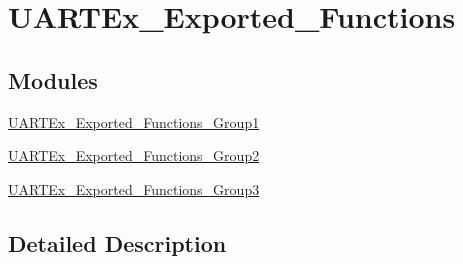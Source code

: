 \hypertarget{group___u_a_r_t_ex___exported___functions}{}\section{U\+A\+R\+T\+Ex\+\_\+\+Exported\+\_\+\+Functions}
\label{group___u_a_r_t_ex___exported___functions}
\subsection*{Modules}
\begin{DoxyCompactItemize}
\item 
\mbox{\hyperlink{group___u_a_r_t_ex___exported___functions___group1}{U\+A\+R\+T\+Ex\+\_\+\+Exported\+\_\+\+Functions\+\_\+\+Group1}}
\item 
\mbox{\hyperlink{group___u_a_r_t_ex___exported___functions___group2}{U\+A\+R\+T\+Ex\+\_\+\+Exported\+\_\+\+Functions\+\_\+\+Group2}}
\item 
\mbox{\hyperlink{group___u_a_r_t_ex___exported___functions___group3}{U\+A\+R\+T\+Ex\+\_\+\+Exported\+\_\+\+Functions\+\_\+\+Group3}}
\end{DoxyCompactItemize}


\subsection{Detailed Description}
